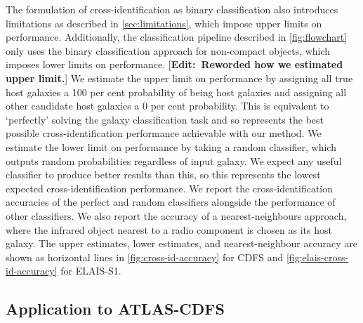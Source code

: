 \documentclass[fleqn,usenatbib,usedcolumn]{mnras}
\newcommand{\edit}[1]{ {\color{red}[{\bf Edit:~{#1}}]} }
\begin{document}
    The formulation of cross-identification as binary classification also introduces limitations as described in \autoref{sec:limitations}, which impose upper limits on performance. Additionally, the classification pipeline described in \autoref{fig:flowchart} only uses the binary classification approach for non-compact objects, which imposes lower limits on performance. \edit{Reworded how we estimated upper limit.} We estimate the upper limit on performance by assigning all true host galaxies a 100 per cent probability of being host galaxies and assigning all other candidate host galaxies a 0 per cent probability. This is equivalent to `perfectly' solving the galaxy classification task and so represents the best possible cross-identification performance achievable with our method. We estimate the lower limit on performance by taking a random classifier, which outputs random probabilities regardless of input galaxy. We expect any useful classifier to produce better results than this, so this represents the lowest expected cross-identification performance. We report the cross-identification accuracies of the perfect and random classifiers alongside the performance of other classifiers. We also report the accuracy of a nearest-neighbours approach, where the infrared object nearest to a radio component is chosen as its host galaxy. The upper estimates, lower estimates, and nearest-neighbour accuracy are shown as horizontal lines in \autoref{fig:cross-id-accuracy}
    for CDFS and \autoref{fig:elais-cross-id-accuracy} for ELAIS-S1.

  \subsection{Application to ATLAS-CDFS}
\end{document}
